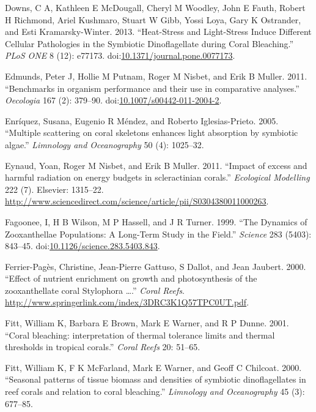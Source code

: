 \documentclass[]{elsarticle} %
\begin{document}
\hypertarget{ref-Downs:2013kc}{}
Downs, C A, Kathleen E McDougall, Cheryl M Woodley, John E Fauth, Robert
H Richmond, Ariel Kushmaro, Stuart W Gibb, Yossi Loya, Gary K Ostrander,
and Esti Kramarsky-Winter. 2013. ``Heat-Stress and Light-Stress Induce
Different Cellular Pathologies in the Symbiotic Dinoflagellate during
Coral Bleaching.'' \emph{PLoS ONE} 8 (12): e77173.
doi:\href{https://doi.org/10.1371/journal.pone.0077173}{10.1371/journal.pone.0077173}.

\hypertarget{ref-Edmunds:2011bv}{}
Edmunds, Peter J, Hollie M Putnam, Roger M Nisbet, and Erik B Muller.
2011. ``Benchmarks in organism performance and their use in comparative
analyses.'' \emph{Oecologia} 167 (2): 379--90.
doi:\href{https://doi.org/10.1007/s00442-011-2004-2}{10.1007/s00442-011-2004-2}.

\hypertarget{ref-Enriquez:2005p142}{}
Enríquez, Susana, Eugenio R Méndez, and Roberto Iglesias-Prieto. 2005.
``Multiple scattering on coral skeletons enhances light absorption by
symbiotic algae.'' \emph{Limnology and Oceanography} 50 (4): 1025--32.

\hypertarget{ref-Eynaud:2011tv}{}
Eynaud, Yoan, Roger M Nisbet, and Erik B Muller. 2011. ``Impact of
excess and harmful radiation on energy budgets in scleractinian
corals.'' \emph{Ecological Modelling} 222 (7). Elsevier: 1315--22.
\url{http://www.sciencedirect.com/science/article/pii/S0304380011000263}.

\hypertarget{ref-Fagoonee:1999p4136}{}
Fagoonee, I, H B Wilson, M P Hassell, and J R Turner. 1999. ``The
Dynamics of Zooxanthellae Populations: A Long-Term Study in the Field.''
\emph{Science} 283 (5403): 843--45.
doi:\href{https://doi.org/10.1126/science.283.5403.843}{10.1126/science.283.5403.843}.

\hypertarget{ref-FerrierPages:2000p1950}{}
Ferrier-Pagès, Christine, Jean-Pierre Gattuso, S Dallot, and Jean
Jaubert. 2000. ``Effect of nutrient enrichment on growth and
photosynthesis of the zooxanthellate coral Stylophora \ldots{}.''
\emph{Coral Reefs}.
\url{http://www.springerlink.com/index/3DRC3K1Q57TPC0UT.pdf}.

\hypertarget{ref-Fitt:2001p832}{}
Fitt, William K, Barbara E Brown, Mark E Warner, and R P Dunne. 2001.
``Coral bleaching: interpretation of thermal tolerance limits and
thermal thresholds in tropical corals.'' \emph{Coral Reefs} 20: 51--65.

\hypertarget{ref-Fitt:2000p3792}{}
Fitt, William K, F K McFarland, Mark E Warner, and Geoff C Chilcoat.
2000. ``Seasonal patterns of tissue biomass and densities of symbiotic
dinoflagellates in reef corals and relation to coral bleaching.''
\emph{Limnology and Oceanography} 45 (3): 677--85.
\end{document}
